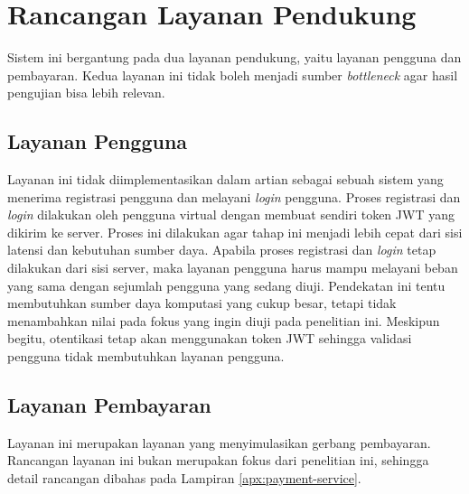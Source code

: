 \section{Rancangan Layanan Pendukung}

Sistem ini bergantung pada dua layanan pendukung, yaitu layanan pengguna dan pembayaran. Kedua layanan ini tidak boleh menjadi sumber \textit{bottleneck} agar hasil pengujian bisa lebih relevan.

\subsection{Layanan Pengguna}

Layanan ini tidak diimplementasikan dalam artian sebagai sebuah sistem yang menerima registrasi pengguna dan melayani \textit{login} pengguna. Proses registrasi dan \textit{login} dilakukan oleh pengguna virtual dengan membuat sendiri token JWT yang dikirim ke server. Proses ini dilakukan agar tahap ini menjadi lebih cepat dari sisi latensi dan kebutuhan sumber daya. Apabila proses registrasi dan \textit{login} tetap dilakukan dari sisi server, maka layanan pengguna harus mampu melayani beban yang sama dengan sejumlah pengguna yang sedang diuji. Pendekatan ini tentu membutuhkan sumber daya komputasi yang cukup besar, tetapi tidak menambahkan nilai pada fokus yang ingin diuji pada penelitian ini. Meskipun begitu, otentikasi tetap akan menggunakan token JWT sehingga validasi pengguna tidak membutuhkan layanan pengguna.

\subsection{Layanan Pembayaran}

Layanan ini merupakan layanan yang menyimulasikan gerbang pembayaran. Rancangan layanan ini bukan merupakan fokus dari penelitian ini, sehingga detail rancangan dibahas pada Lampiran \ref{apx:payment-service}.

